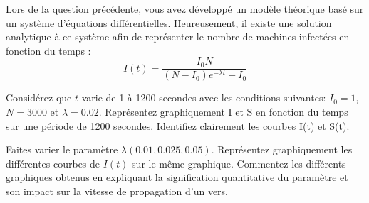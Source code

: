 
\begin{homeworkProblem}
Lors de la question précédente, vous avez développé un modèle théorique basé sur un
système d’équations différentielles. Heureusement, il existe une solution analytique à ce
système afin de représenter le nombre de machines infectées en fonction du temps :
\begin{equation}
I(t)=\frac{I_0 N}{(N-I_0)e^{-\lambda t}+I_0}
\label{moneq}
\end{equation}

\begin{homeworkSection}{3.1}
Considérez que $t$ varie de 1 à 1200 secondes avec les conditions suivantes: $I_0= 1$, $N=3000$ et  $\lambda=0.02$. Représentez graphiquement I et S en fonction du temps sur une
période de 1200 secondes. Identifiez clairement les courbes I(t) et S(t).
\end{homeworkSection}

\begin{homeworkSection}{3.2}

Faites varier le paramètre  $\lambda (0.01, 0.025, 0.05)$. Représentez graphiquement les différentes courbes de $I(t)$ sur le même graphique. Commentez les différents graphiques obtenus en expliquant la signification quantitative du paramètre  et son impact sur la vitesse de propagation d'un vers. 

\end{homeworkSection}

\end{homeworkProblem}
